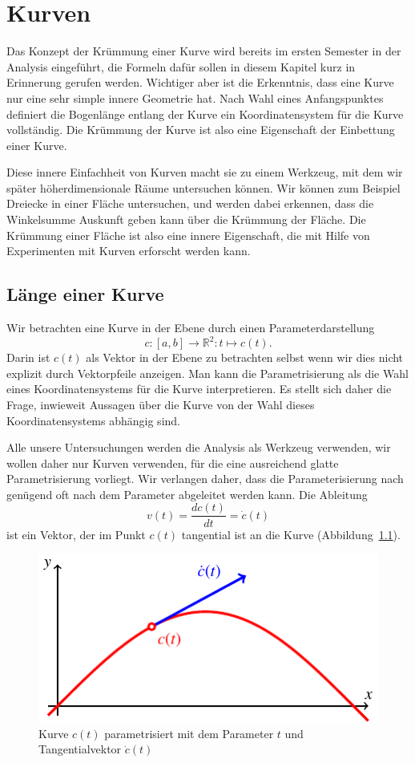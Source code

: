 %
%
%
\chapter{Kurven%
\label{skript:kruemmung:section:kurve}}
\rhead{}
Das Konzept der Krümmung einer Kurve wird bereits im ersten Semester
in der Analysis eingeführt,
die Formeln dafür sollen in diesem Kapitel kurz in Erinnerung gerufen werden.
Wichtiger aber ist die Erkenntnis, dass eine Kurve nur eine sehr simple
innere Geometrie hat.
Nach Wahl eines Anfangspunktes definiert die Bogenlänge entlang der Kurve 
ein Koordinatensystem für die Kurve vollständig.
Die Krümmung der Kurve ist also eine Eigenschaft der Einbettung einer Kurve.

Diese innere Einfachheit von Kurven macht sie zu einem Werkzeug, mit
dem wir später höherdimensionale Räume untersuchen können.
Wir können zum Beispiel Dreiecke in einer Fläche untersuchen,
und werden dabei erkennen, dass die Winkelsumme Auskunft geben kann
über die Krümmung der Fläche.
Die Krümmung einer Fläche ist also eine innere Eigenschaft, die mit
Hilfe von Experimenten mit Kurven erforscht werden kann.

\section{Länge einer Kurve}
Wir betrachten eine Kurve in der Ebene durch einen Parameterdarstellung
\[
c\colon [a,b] \to\mathbb R^2:t\mapsto c(t).
\]
Darin ist $c(t)$ als Vektor in der Ebene zu betrachten selbst wenn
wir dies nicht explizit durch Vektorpfeile anzeigen.
Man kann die Parametrisierung als die Wahl eines Koordinatensystems
für die Kurve interpretieren.
Es stellt sich daher die Frage, inwieweit Aussagen über die Kurve von
der Wahl dieses Koordinatensystems abhängig sind.

Alle unsere Untersuchungen werden die Analysis als Werkzeug verwenden,
wir wollen daher nur Kurven verwenden, für die eine ausreichend glatte
Parametrisierung vorliegt.
Wir verlangen daher, dass die Parameterisierung nach genügend oft nach
dem Parameter abgeleitet werden kann.
Die Ableitung 
\[
v(t)
=
\frac{dc(t)}{dt}
=
\dot c(t)
\]
ist ein Vektor, der im Punkt $c(t)$ tangential ist an die Kurve 
(Abbildung~\ref{skript:kurve:tangente}).
\begin{figure}
\centering
\includegraphics{chapters/tikz/tangente.pdf}
\caption{Kurve $c(t)$ parametrisiert mit dem Parameter $t$ und Tangentialvektor
$\dot c(t)$
\label{skript:kurve:tangente}}
\end{figure}

